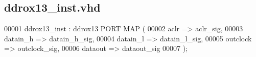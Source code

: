 \subsection{ddrox13\+\_\+inst.\+vhd}
\label{ddrox13__inst_8vhd_source}

\begin{DoxyCode}
00001 ddrox13\_inst : ddrox13 \textcolor{keywordflow}{PORT} \textcolor{keywordflow}{MAP} (
00002         aclr     => aclr\_sig,
00003         datain_h     => datain\_h\_sig,
00004         datain_l     => datain\_l\_sig,
00005         outclock     => outclock\_sig,
00006         dataout  => dataout\_sig
00007     \textcolor{vhdlchar}{)};
\end{DoxyCode}
